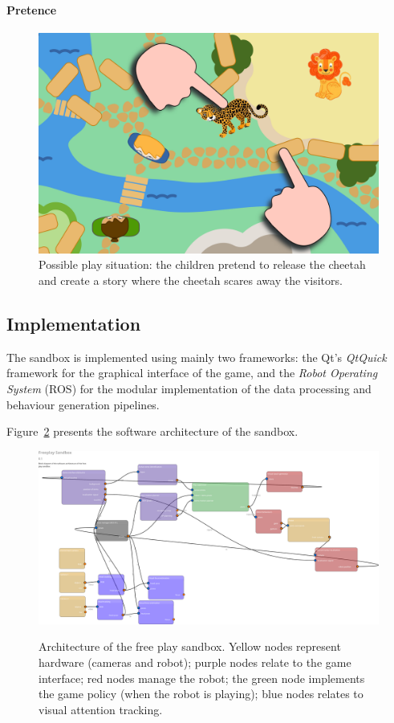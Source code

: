 \documentclass[a4paper]{article}
\begin{document}
\paragraph{Pretence}

\begin{figure}
    \centering
    \includegraphics[width=0.7\linewidth]{sandbox-release-cheetah}
    \caption{Possible play situation: the children pretend to release the cheetah
    and create a story where the cheetah scares away the visitors.}
    \label{}
\end{figure}

\subsection{Implementation}

The sandbox is implemented using mainly two frameworks: the Qt's \emph{QtQuick} framework
for the graphical interface of the game, and the \emph{Robot Operating System}
(ROS) for the modular implementation of the data processing and behaviour
generation pipelines.

Figure~\ref{fig|architecture} presents the software architecture of the sandbox.

\begin{figure}
    \centering
    \includegraphics[width=\linewidth]{freeplay-sandbox-architecture}
\label{fig|architecture}
\caption{Architecture of the free play sandbox. Yellow nodes represent
    hardware (cameras and robot); purple nodes relate to the game interface;
    red nodes manage the robot; the green node implements the game policy (when
    the robot is playing); blue nodes relates to visual attention tracking.}
\end{figure}
\end{document}
